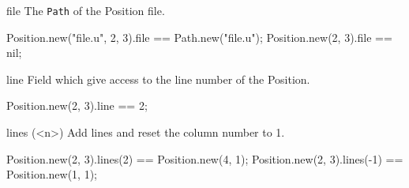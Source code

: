 \begin{urbiscriptapi}
\item[file]
  The \lstinline|Path| of the Position file.
\begin{urbiassert}
Position.new("file.u", 2, 3).file == Path.new("file.u");
Position.new(2, 3).file == nil;
\end{urbiassert}

\item[line]
  Field which give access to the line number of the Position.
\begin{urbiassert}
Position.new(2, 3).line == 2;
\end{urbiassert}

\item[lines](<n>)%
  Add  lines and reset the column number to 1.
\begin{urbiassert}
Position.new(2, 3).lines(2) == Position.new(4, 1);
Position.new(2, 3).lines(-1) == Position.new(1, 1);
\end{urbiassert}

\end{urbiscriptapi}


